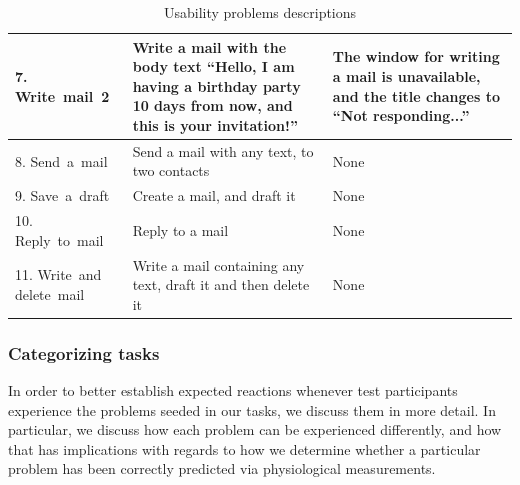 \begin{table}[h]
\begin{tabular}[c]{|p{60pt}|p{80pt}|p{80pt}|}
    \small{7. Write~mail~2}           & \small{Write a mail with the body text ``Hello, I am having a birthday party 10 days from now, and this is your invitation!''} & \small{The window for writing a mail is unavailable, and the title changes to ``Not responding...''}                                                \\ \hline
    \small{8. Send~a~mail}            & \small{Send a mail with any text, to two contacts}                                                                             & \small{None}                                                                                                                                        \\ \hline
    \small{9. Save~a~draft}           & \small{Create a mail, and draft it}                                                                                            & \small{None}                                                                                                                                        \\ \hline
    \small{10. Reply~to~mail}         & \small{Reply to a mail}                                                                                                        & \small{None}                                                                                                                                        \\ \hline
    \small{11. Write~and delete~mail} & \small{Write a mail containing any text, draft it and then delete it}                                                          & \small{None}                                                                                                                                        \\ \hline
  \end{tabular}
  \caption{Usability problems descriptions}
  \label{tab:ups-desc}
\end{table}

\subsubsection{Categorizing tasks}
In order to better establish expected reactions whenever test participants experience the problems seeded in our tasks,
we discuss them in more detail. In particular, we discuss how each problem can be experienced differently, and how that
has implications with regards to how we determine whether a particular problem has been correctly predicted via physiological
measurements.

